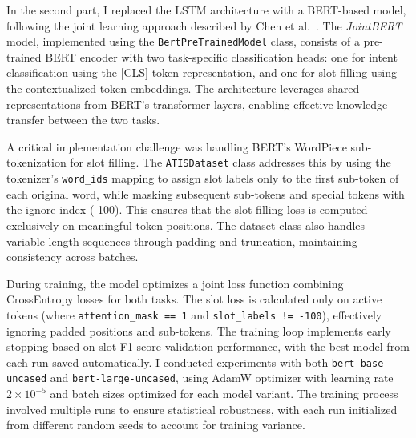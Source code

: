 \documentclass[a4paper]{article}
\begin{document}
In the second part, I replaced the LSTM architecture with a BERT-based model, following the joint learning approach described by Chen et al.~\cite{chen2019bertjointintentclassification}.
The \textit{JointBERT} model, implemented using the \texttt{BertPreTrainedModel} class, consists of a pre-trained BERT encoder with two task-specific classification heads: one for intent classification using the [CLS] token representation, and one for slot filling using the contextualized token embeddings.
The architecture leverages shared representations from BERT's transformer layers, enabling effective knowledge transfer between the two tasks.

A critical implementation challenge was handling BERT's WordPiece sub-tokenization for slot filling.
The \texttt{ATISDataset} class addresses this by using the tokenizer's \texttt{word\_ids} mapping to assign slot labels only to the first sub-token of each original word, while masking subsequent sub-tokens and special tokens with the ignore index (-100).
This ensures that the slot filling loss is computed exclusively on meaningful token positions.
The dataset class also handles variable-length sequences through padding and truncation, maintaining consistency across batches.

During training, the model optimizes a joint loss function combining CrossEntropy losses for both tasks.
The slot loss is calculated only on active tokens (where \texttt{attention\_mask == 1} and \texttt{slot\_labels != -100}), effectively ignoring padded positions and sub-tokens.
The training loop implements early stopping based on slot F1-score validation performance, with the best model from each run saved automatically.
I conducted experiments with both \texttt{bert-base-uncased} and \texttt{bert-large-uncased}, using AdamW optimizer with learning rate $2 \times 10^{-5}$ and batch sizes optimized for each model variant.
The training process involved multiple runs to ensure statistical robustness, with each run initialized from different random seeds to account for training variance.
\end{document}
